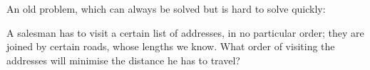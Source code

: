 An old problem, which can always be solved but is hard to
solve quickly:
\par
A salesman has to visit a certain list of addresses, in no
particular order; they are joined by certain roads, whose 
lengths we know. What order of visiting the addresses will
minimise the distance he has to travel?